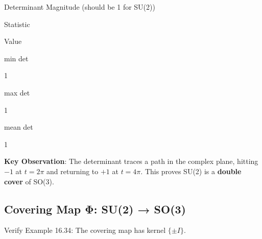 \documentclass[
]{book}
\theoremstyle{definition}
\theoremstyle{definition}
\theoremstyle{definition}
\theoremstyle{definition}
\theoremstyle{remark}
\begin{document}
\label{tab:su2-det-evolution}Determinant Magnitude (should be 1 for SU(2))

Statistic

Value

min \textbar det\textbar{}

1

max \textbar det\textbar{}

1

mean \textbar det\textbar{}

1

\textbf{Key Observation}: The determinant traces a path in the complex plane, hitting \(-1\) at \(t = 2\pi\) and returning to \(+1\) at \(t = 4\pi\). This proves SU(2) is a \textbf{double cover} of SO(3).

\subsection{Covering Map Φ: SU(2) → SO(3)}\label{covering-map-ux3c6-su2-so3}

Verify Example 16.34: The covering map has kernel \(\{\pm I\}\).
\end{document}

